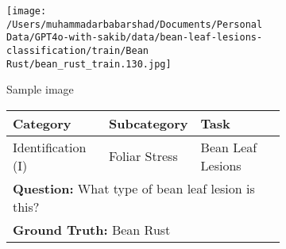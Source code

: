 
    \begin{figure}[htbp]
    \centering
    \begin{subfigure}[c]{0.3\textwidth}
        \centering
        \texttt{[image: /Users/muhammadarbabarshad/Documents/Personal Data/GPT4o-with-sakib/data/bean-leaf-lesions-classification/train/Bean Rust/bean\_rust\_train.130.jpg]}
        \caption{Sample image}
    \end{subfigure}
    \hfill
    \begin{subfigure}[c]{0.65\textwidth}
        \centering
        \begin{tabular}{lll}
            \toprule
            \textbf{Category} & \textbf{Subcategory} & \textbf{Task} \\
            \midrule
            Identification (I) & Foliar Stress & Bean Leaf Lesions \\
            \midrule
            \multicolumn{3}{l}{\textbf{Question:} What type of bean leaf lesion is this?} \\
            \multicolumn{3}{l}{\textbf{Ground Truth:} Bean Rust} \\
            \bottomrule
        \end{tabular}
    \end{subfigure}

    \vspace{1em}


\end{figure}
